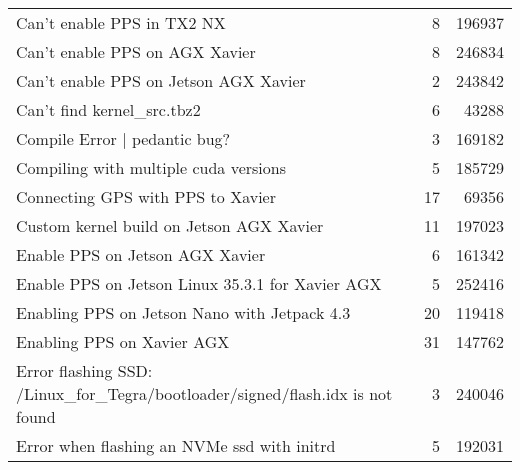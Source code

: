 \begin{longtable}{p{}rr}
    Can’t enable PPS in TX2 NX                                                                                                         & 8       & 196937 \\
    Can’t enable PPS on AGX Xavier                                                                                                     & 8       & 246834 \\
    Can’t enable PPS on Jetson AGX Xavier                                                                                              & 2       & 243842 \\
    Can’t find kernel\_src.tbz2                                                                                                        & 6       & 43288  \\
    Compile Error | pedantic bug?                                                                                                      & 3       & 169182 \\
    Compiling with multiple cuda versions                                                                                              & 5       & 185729 \\
    Connecting GPS with PPS to Xavier                                                                                                  & 17      & 69356  \\
    Custom kernel build on Jetson AGX Xavier                                                                                           & 11      & 197023 \\
    Enable PPS on Jetson AGX Xavier                                                                                                    & 6       & 161342 \\
    Enable PPS on Jetson Linux 35.3.1 for Xavier AGX                                                                                   & 5       & 252416 \\
    Enabling PPS on Jetson Nano with Jetpack 4.3                                                                                       & 20      & 119418 \\
    Enabling PPS on Xavier AGX                                                                                                         & 31      & 147762 \\
    Error flashing SSD: /Linux\_for\_Tegra/bootloader/signed/flash.idx is not found                                                    & 3       & 240046 \\
    Error when flashing an NVMe ssd with initrd                                                                                        & 5       & 192031 \\

\end{longtable}
